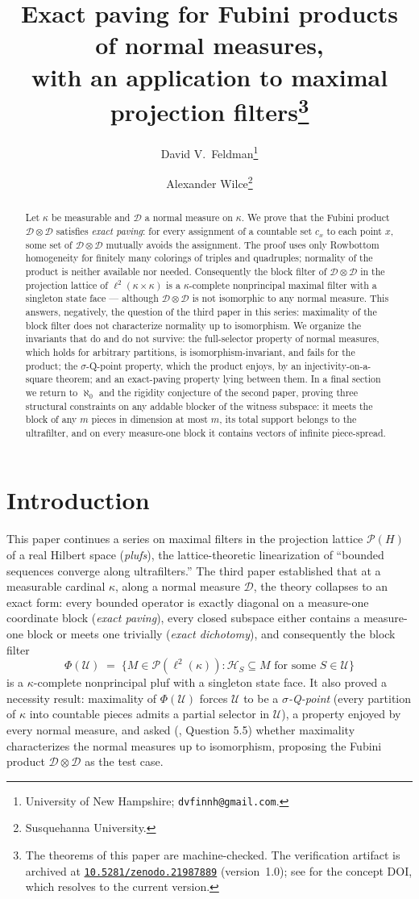 \documentclass[11pt]{article}
\title{Exact paving for Fubini products of normal measures,\\
with an application to maximal projection filters\thanks{The theorems of this paper are machine-checked. The verification artifact is archived at \href{https://doi.org/10.5281/zenodo.21987889}{\texttt{10.5281/zenodo.21987889}} (version~1.0); see \cite{plufLean} for the concept DOI, which resolves to the current version.}}
\author{David V.\ Feldman\thanks{University of New Hampshire;
\texttt{dvfinnh@gmail.com}.}
\and Alexander Wilce\thanks{Susquehanna University.}}
\date{}
\theoremstyle{definition}
\newcommand{\HH}{\mathcal{H}}
\newcommand{\PP}{\mathcal{P}}
\newcommand{\U}{\mathcal{U}}
\newcommand{\D}{\mathcal{D}}
\newcommand{\lk}{\ell^2(\kappa)}
\begin{document}
\maketitle

\begin{abstract}
Let $\kappa$ be measurable and $\D$ a normal measure on $\kappa$. We prove
that the Fubini product $\D\otimes\D$ satisfies \emph{exact paving}: for
every assignment of a countable set $c_x$ to each point $x$, some set of
$\D\otimes\D$ mutually avoids the assignment. The proof uses only Rowbottom
homogeneity for finitely many colorings of triples and quadruples; normality
of the product is neither available nor needed. Consequently the block
filter of $\D\otimes\D$ in the projection lattice of $\ell^2(\kappa\times
\kappa)$ is a $\kappa$-complete nonprincipal maximal filter with a singleton
state face --- although $\D\otimes\D$ is not isomorphic to any normal
measure. This answers, negatively, the question of the third paper in this
series: maximality of the block filter does not characterize normality up to
isomorphism. We organize the invariants that do and do not survive: the
full-selector property of normal measures, which holds for arbitrary
partitions, is isomorphism-invariant, and fails for the product; the
$\sigma$-Q-point property, which the product enjoys, by an
injectivity-on-a-square theorem; and an exact-paving property lying between
them.
In a final section we return to $\aleph_0$ and the rigidity conjecture of
the second paper, proving three structural constraints on any addable
blocker of the witness subspace: it meets the block of any $m$ pieces in
dimension at most $m$, its total support belongs to the ultrafilter, and on
every measure-one block it contains vectors of infinite piece-spread.
\end{abstract}

\section{Introduction}\label{sec:intro}

This paper continues a series \cite{FWI,FWII,FWIII} on maximal filters in
the projection lattice $\PP(H)$ of a real Hilbert space (\emph{plufs}), the
lattice-theoretic linearization of ``bounded sequences converge along
ultrafilters.'' The third paper established that at a measurable cardinal
$\kappa$, along a normal measure $\D$, the theory collapses to an exact
form: every bounded operator is exactly diagonal on a measure-one
coordinate block (\emph{exact paving}), every closed subspace either
contains a measure-one block or meets one trivially (\emph{exact
dichotomy}), and consequently the block filter
\[
\Phi(\U)\;=\;\{M\in\PP(\lk):\HH_S\subseteq M\text{ for some }S\in\U\}
\]
is a $\kappa$-complete nonprincipal pluf with a singleton state face. It
also proved a necessity result: maximality of $\Phi(\U)$ forces $\U$ to be a
\emph{$\sigma$-Q-point} (every partition of $\kappa$ into countable pieces
admits a partial selector in $\U$), a property enjoyed by every normal
measure, and asked (\cite{FWIII}, Question 5.5) whether maximality
characterizes the normal measures up to isomorphism, proposing the Fubini
product $\D\otimes\D$ as the test case.
\end{document}
